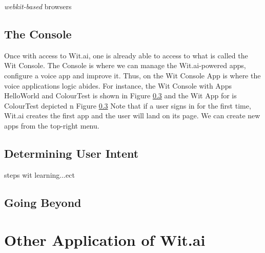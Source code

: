\documentclass[twoside,11pt]{article}
\begin{document}
\emph{webkit-based} browsers


\subsection{The Console}

Once with access to Wit.ai, one is already able to access to what is called the Wit Console. 
The Console is where we can manage the Wit.ai-powered apps, configure a voice app and improve it.
Thus, on the Wit Console App is where the voice applications logic abides.
For instance, the Wit Console with Apps  HelloWorld and ColourTest is shown in Figure \ref{} \subref{} and the Wit App for is ColourTest depicted n Figure \ref{} \subref{}
Note that if a user signs in for the first time, Wit.ai creates the first app and the user will land on its page.
We can create new apps from the top-right menu.


\subsection{Determining User Intent}


steps wit learning...ect

\subsection{Going Beyond}

\section{Other Application of Wit.ai}
\label{sec:app}


\vskip 0.2in

\end{document}
